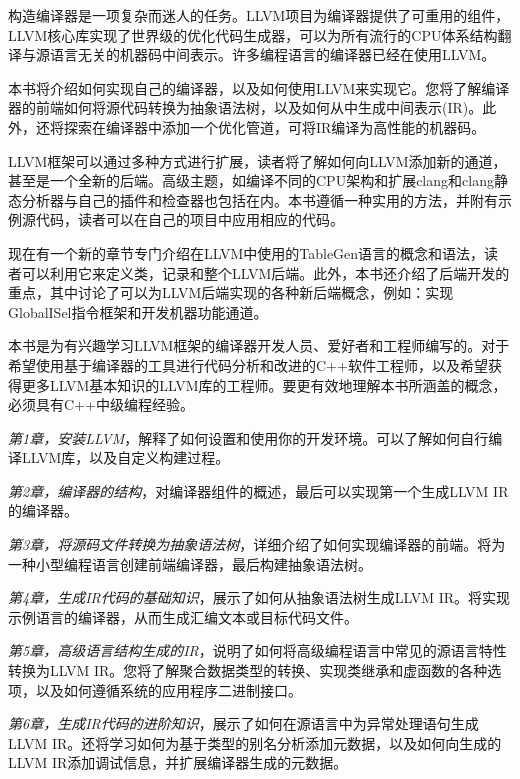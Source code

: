 构造编译器是一项复杂而迷人的任务。LLVM项目为编译器提供了可重用的组件，LLVM核心库实现了世界级的优化代码生成器，可以为所有流行的CPU体系结构翻译与源语言无关的机器码中间表示。许多编程语言的编译器已经在使用LLVM。

本书将介绍如何实现自己的编译器，以及如何使用LLVM来实现它。您将了解编译器的前端如何将源代码转换为抽象语法树，以及如何从中生成中间表示(IR)。此外，还将探索在编译器中添加一个优化管道，可将IR编译为高性能的机器码。

LLVM框架可以通过多种方式进行扩展，读者将了解如何向LLVM添加新的通道，甚至是一个全新的后端。高级主题，如编译不同的CPU架构和扩展clang和clang静态分析器与自己的插件和检查器也包括在内。本书遵循一种实用的方法，并附有示例源代码，读者可以在自己的项目中应用相应的代码。


现在有一个新的章节专门介绍在LLVM中使用的TableGen语言的概念和语法，读者可以利用它来定义类，记录和整个LLVM后端。此外，本书还介绍了后端开发的重点，其中讨论了可以为LLVM后端实现的各种新后端概念，例如：实现GlobalISel指令框架和开发机器功能通道。


本书是为有兴趣学习LLVM框架的编译器开发人员、爱好者和工程师编写的。对于希望使用基于编译器的工具进行代码分析和改进的C++软件工程师，以及希望获得更多LLVM基本知识的LLVM库的工程师。要更有效地理解本书所涵盖的概念，必须具有C++中级编程经验。


\textit{第1章，安装LLVM}，解释了如何设置和使用你的开发环境。可以了解如何自行编译LLVM库，以及自定义构建过程。

\textit{第2章，编译器的结构}，对编译器组件的概述，最后可以实现第一个生成LLVM IR的编译器。

\textit{第3章，将源码文件转换为抽象语法树}，详细介绍了如何实现编译器的前端。将为一种小型编程语言创建前端编译器，最后构建抽象语法树。

\textit{第4章，生成IR代码的基础知识}，展示了如何从抽象语法树生成LLVM IR。将实现示例语言的编译器，从而生成汇编文本或目标代码文件。

\textit{第5章，高级语言结构生成的IR}，说明了如何将高级编程语言中常见的源语言特性转换为LLVM IR。您将了解聚合数据类型的转换、实现类继承和虚函数的各种选项，以及如何遵循系统的应用程序二进制接口。

\textit{第6章，生成IR代码的进阶知识}，展示了如何在源语言中为异常处理语句生成LLVM IR。还将学习如何为基于类型的别名分析添加元数据，以及如何向生成的LLVM IR添加调试信息，并扩展编译器生成的元数据。

